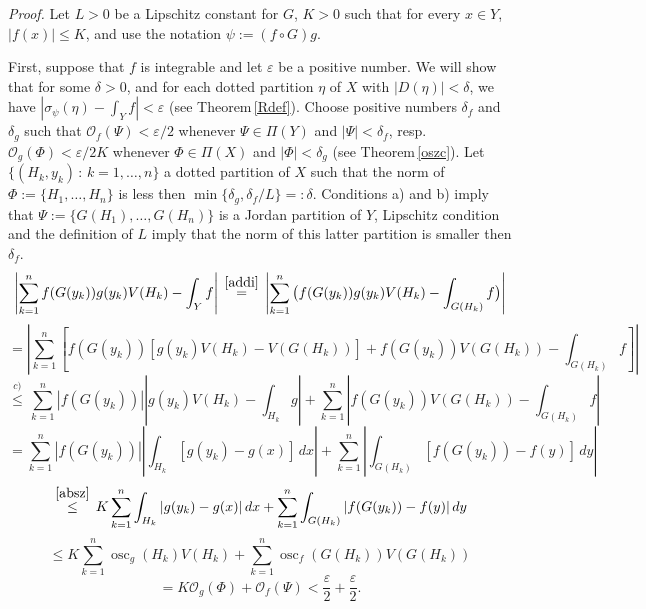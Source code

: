 \documentclass{article}
\newcommand{\proof}[1]{\textit{Proof. }#1}
\newcommand{\osc}{\mathop{\mathrm{osc}}\nolimits}
\newcommand{\OO}{\mathscr{O}}
\newcommand{\ee}{\varepsilon}
\newcommand{\dd}{\delta}
\begin{document}
\proof{ Let $L>0$ be a Lipschitz constant for $G$, $K>0$ such that
for every $x\in Y$, $|f(x)|\le K$, and use the notation
$\psi:=(f\circ G)g$.

First, suppose that $f$ is integrable and let $\ee$ be a positive
number. We will show that for some $\dd>0$, and for each dotted
partition $\eta$ of $X$ with $|D(\eta)|<\dd$, we have
$|\sigma_{\psi}(\eta)-\int_Yf|<\ee$ (see Theorem\,\ref{Rdef}).
Choose positive numbers $\dd_f$ and $\dd_g$ such that
$\OO_f(\Psi)<\ee/2$ whenever $\Psi\in\Pi(Y)$ and $|\Psi|<\dd_f$,
resp. $\OO_g(\Phi)<\ee/2K$ whenever $\Phi\in\Pi(X)$ and
$|\Phi|<\dd_g$ (see Theorem\,\ref{oszc}). Let
$\{(H_k,y_k)\,:\,k=1,\ldots,n\}$ a dotted partition of $X$ such
that the norm of $\Phi:=\{H_1,\ldots,H_n\}$ is less then
$\min\{\dd_g,\dd_f/L\}=:\dd$. Conditions a) and b) imply that
$\Psi:=\{G(H_1),\ldots,G(H_n)\}$ is a Jordan partition of $Y$,
Lipschitz condition and the definition of $L$ imply that the norm
of this latter partition is smaller then $\dd_f$.
\[\left|\sum_{k=1}^nf(G(y_k))g(y_k)V(H_k)-\int_Yf\right|\,\stackrel{\ref{addi}}{=}\,
\left|\sum_{k=1}^n\big(f(G(y_k))g(y_k)V(H_k)-\int_{G(H_k)}f\big)\right|\]
\[=\left|\sum_{k=1}^n\left[f(G(y_k))\left[g(y_k)V(H_k)-V(G(H_k))\right]+
f(G(y_k))V(G(H_k))-\int_{G(H_k)}f\right]\right|\]
\[\stackrel{c)}{\le}\,\sum_{k=1}^n\left|f(G(y_k))\right|\left|g(y_k)V(H_k)-\int_{H_k}g\right|+
\sum_{k=1}^n\left|f(G(y_k))V(G(H_k))-\int_{G(H_k)}f\right|\]
\[=\sum_{k=1}^n\left|f(G(y_k))\right|\left|\int_{H_k}[g(y_k)-g(x)]\,dx\right|+
\sum_{k=1}^n\left|\int_{G(H_k)}[f(G(y_k))-f(y)]\,dy\right|\]
\[\,\stackrel{\ref{absz}}{\le}\,K\sum_{k=1}^n\int_{H_k}|g(y_k)-g(x)|\,dx+
\sum_{k=1}^n\int_{G(H_k)}|f(G(y_k))-f(y)|\,dy\]
\[\le K\sum_{k=1}^n\osc_g(H_k)V(H_k)+\sum_{k=1}^n\osc_f(G(H_k))V(G(H_k))\]
\[=K\OO_g(\Phi)+\OO_f(\Psi)<\dfrac{\ee}{2}+\dfrac{\ee}{2}.\]

}
\end{document}
